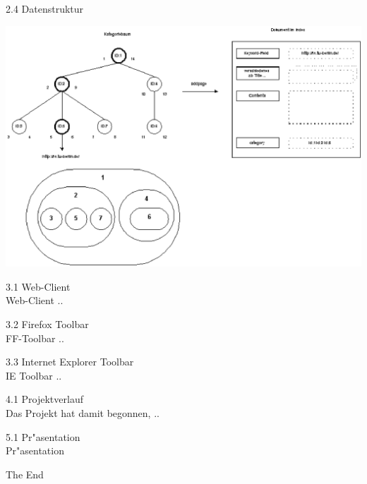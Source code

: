 \documentclass[landscape]{slides}
\begin{document}
%	
\begin{slide}{2.4 Datenstruktur}\\
\begin{center}
\includegraphics[width=17cm]{bilder/katstruktur.eps}
\end{center}
\end{slide}
%
%
%
\begin{slide}{3.1 Web-Client}\\

Web-Client ..

\end{slide}
%
\begin{slide}{3.2 Firefox Toolbar}\\
FF-Toolbar ..
\end{slide}
%
%
%
\begin{slide}{3.3 Internet Explorer Toolbar}\\
IE Toolbar ..
\end{slide}
%
\begin{slide}{4.1 Projektverlauf}\\
Das Projekt hat damit begonnen, ..
\end{slide}
%
%
%
\begin{slide}{5.1 Pr"asentation}\\
Pr"asentation
\end{slide}
%
%
%
%
\begin{slide}{}
The End
\end{slide}
\end{document}
